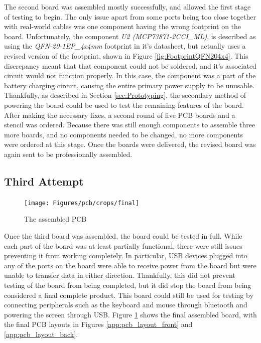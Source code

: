 The second board was assembled mostly successfully, and allowed the first stage of testing to begin.
The only issue apart from some ports being too close together with real-world cables was one component having the wrong footprint on the board.
Unfortunately, the component \emph{U2 (MCP73871-2CCI\_ML)}, is described as using the \emph{QFN-20-1EP\_4x4mm} footprint in it's datasheet, but actually uses a revised version of the footprint, shown in Figure \ref{fig:FootprintQFN204x4}.
This discrepancy meant that that component could not be soldered, and it's associated circuit would not function properly.
In this case, the component was a part of the battery charging circuit, causing the entire primary power supply to be unusable.
Thankfully, as described in Section \ref{sec:Prototyping}, the secondary method of powering the board could be used to test the remaining features of the board.
After making the necessary fixes, a second round of five PCB boards and a stencil was ordered.
Because there was still enough components to assemble three more boards, and no components needed to be changed, no more components were ordered at this stage.
Once the boards were delivered, the revised board was again sent to be professionally assembled.

\subsection{Third Attempt}\label{subsec:Manufacturing3}

\begin{figure}[t]
  \centering
  \texttt{[image: Figures/pcb/crops/final]}
  \caption[Assembled PCB]{The assembled PCB}
  \label{fig:AssembledPCB}
\end{figure}

Once the third board was assembled, the board could be tested in full.
While each part of the board was at least partially functional, there were still issues preventing it from working completely.
In particular, USB devices plugged into any of the ports on the board were able to receive power from the board but were unable to transfer data in either direction.
Thankfully, this did not prevent testing of the board from being completed, but it did stop the board from being considered a final complete product.
This board could still be used for testing by connecting peripherals such as the keyboard and mouse through bluetooth and powering the screen through USB.
Figure \ref{fig:AssembledPCB} shows the final assembled board, with the final PCB layouts in Figures \ref{app:pcb_layout_front} and \ref{app:pcb_layout_back}.